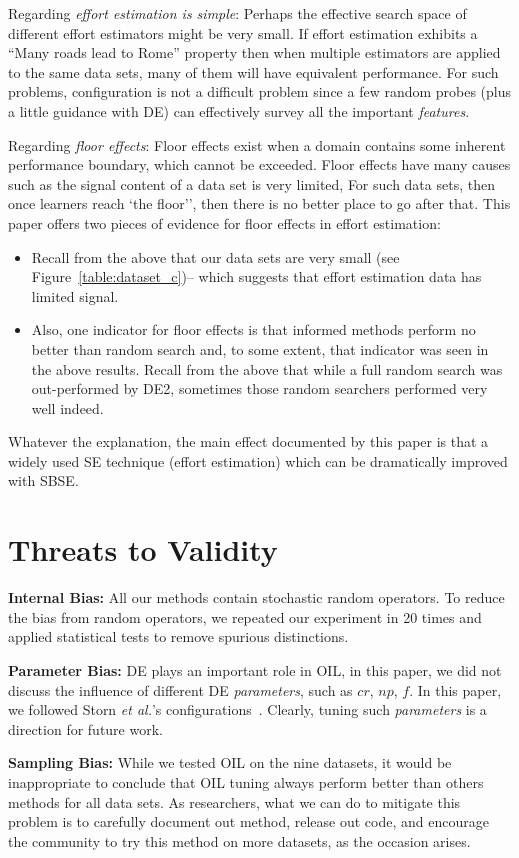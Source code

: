 \documentclass[10pt,conference]{IEEEtran}
\newcommand{\bi}{\begin{itemize}}
\newcommand{\ei}{\end{itemize}}
\begin{document}
Regarding {\em effort estimation  is simple}:  Perhaps  the   effective search
space of different effort estimators might be  very small. If effort estimation exhibits a ``Many roads lead to Rome'' property then
when multiple estimators are applied to the same data sets,  many of them will have equivalent performance. For such problems, configuration is not
a difficult problem since a few random probes (plus a little guidance with DE) can effectively survey all the important 
{\em features}.

Regarding {\em floor effects}: Floor effects exist when  a domain contains
some inherent performance boundary, which cannot be exceeded.
Floor effects have many causes such as the signal content of a data set is very limited,
For such data sets, then once learners reach
`the floor'', then there is no better place
to go after that.  This paper offers two pieces of evidence for floor effects in effort estimation:
\bi
\item
Recall from the above that our data sets are very small
(see Figure~\ref{table:dataset_c})-- which
suggests that effort estimation data has limited
signal. 
\item
Also, one indicator for floor effects is that informed methods perform no better
than random search and, to some extent, that indicator was seen in the above results.
Recall from the above that while a full random search was out-performed by DE2, sometimes those random
searchers performed very well indeed.
\ei
Whatever the explanation, the main effect documented by this paper   is that   a widely used SE
technique (effort estimation) which can be dramatically
improved with SBSE.

\section{Threats to Validity}\label{sect:threats}
 \textbf{Internal Bias:} All our methods contain stochastic random operators. To reduce the bias from random operators, we 
repeated our experiment in 20 times and applied statistical tests to remove spurious distinctions.

 \textbf{Parameter Bias:} DE plays an important role in OIL, in this paper, we did not discuss the influence of different DE
{\em parameters}, such as $cr$, $np$, $f$. In this paper, we followed Storn {\it et al.}'s configurations~\cite{storn1997differential}. Clearly, tuning such {\em parameters} is
a direction for  future work.


\textbf{Sampling Bias:} While we tested OIL on the nine datasets, it would be inappropriate to conclude that OIL tuning  always perform better than
others methods for all data sets.
As researchers, what we can do to mitigate this problem is to carefully document out method, release out code,
and encourage the community to try this method on more datasets, as the occasion arises.
\end{document}
